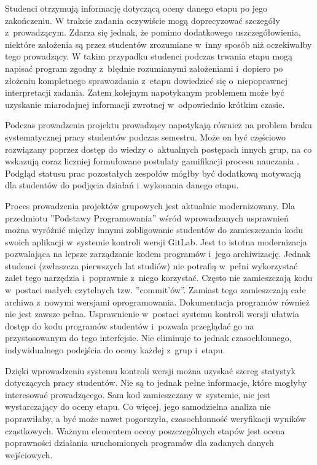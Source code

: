 Studenci otrzymują informację dotyczącą oceny danego etapu po jego zakończeniu.
W trakcie zadania oczywiście mogą doprecyzować szczegóły z~prowadzącym.
Zdarza się jednak, że pomimo dodatkowego uszczegółowienia, niektóre założenia są przez studentów zrozumiane w~inny sposób niż oczekiwałby tego prowadzący.
W takim przypadku studenci podczas trwania etapu mogą napisać program zgodny z~błędnie rozumianymi założeniami i~dopiero po złożeniu kompletnego sprawozdania z~etapu dowiedzieć się o~niepoprawnej interpretacji zadania.
Zatem kolejnym napotykanym problemem może być uzyskanie miarodajnej informacji zwrotnej w~odpowiednio krótkim czasie.

Podczas prowadzenia projektu prowadzący napotykają również na problem braku systematycznej pracy studentów podczas semestru.
Może on być częściowo rozwiązany poprzez dostęp do wiedzy o~aktualnych postępach innych grup, na co wskazują coraz liczniej formułowane postulaty gamifikacji procesu nauczania \cite{gamification}.
Podgląd statusu prac pozostałych zespołów mógłby być dodatkową motywacją dla studentów do podjęcia działań i~wykonania danego etapu.

Proces prowadzenia projektów grupowych jest aktualnie modernizowany.
Dla przedmiotu ”Podstawy Programowania” wśród wprowadzanych usprawnień można wyróżnić między innymi zobligowanie studentów do zamieszczania kodu swoich aplikacji w~systemie kontroli wersji GitLab.
Jest to istotna modernizacja pozwalająca na lepsze zarządzanie kodem programów i~jego archiwizację.
Jednak studenci (zwłaszcza pierwszych lat studiów) nie potrafią w~pełni wykorzystać zalet tego narzędzia i~poprawnie z~niego korzystać.
Często nie zamieszczają kodu w~postaci małych czytelnych tzw. ”commit'ów”.
Zamiast tego zamieszczają całe archiwa z~nowymi wersjami oprogramowania.
Dokumentacja programów również nie jest zawsze pełna.
Usprawnienie w~postaci systemu kontroli wersji ułatwia dostęp do kodu programów studentów i~pozwala przeglądać go na przystosowanym do tego interfejsie.
Nie eliminuje to jednak czasochłonnego, indywidualnego podejścia do oceny każdej z~grup i~etapu.

Dzięki wprowadzeniu systemu kontroli wersji można uzyskać szereg statystyk dotyczących pracy studentów.
Nie są to jednak pełne informacje, które mogłyby interesować prowadzącego.
Sam kod zamieszczany w~systemie, nie jest wystarczający do oceny etapu.
Co więcej, jego samodzielna analiza nie poprawiłaby, a być może nawet pogorszyła, czasochłonność weryfikacji wyników cząstkowych.
Ważnym elementem oceny poszczególnych etapów jest ocena poprawności działania uruchomionych programów dla zadanych danych wejściowych.

